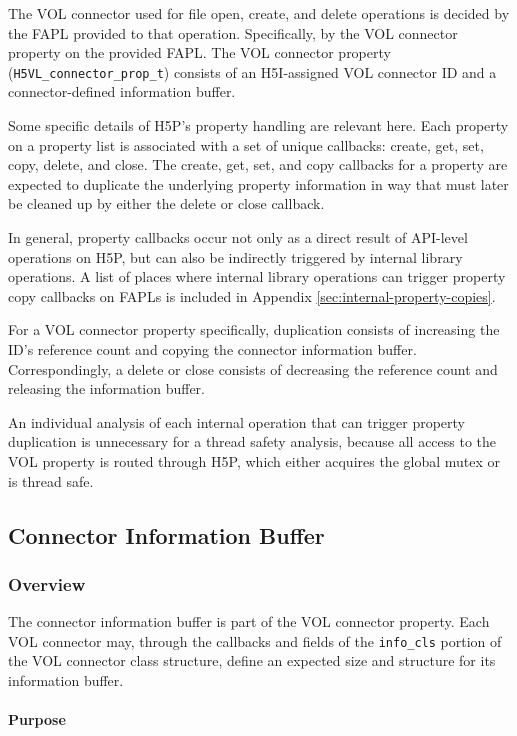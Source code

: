\documentclass{article}
\begin{document}
The VOL connector used for file open, create, and delete operations is decided by the FAPL provided to that operation. Specifically, by the VOL connector property on the provided FAPL. The VOL connector property (\texttt{H5VL\_connector\_prop\_t}) consists of an H5I-assigned VOL connector ID and a connector-defined information buffer.

Some specific details of H5P's property handling are relevant here. Each property on a property list is associated with a set of unique callbacks: create, get, set, copy, delete, and close. The create, get, set, and copy callbacks for a property are expected to duplicate the underlying property information in way that must later be cleaned up by either the delete or close callback.

In general, property callbacks occur not only as a direct result of API-level operations on H5P, but can also be indirectly triggered by internal library operations. A list of places where internal library operations can trigger property copy callbacks on FAPLs is included in Appendix \ref{sec:internal-property-copies}.

For a VOL connector property specifically, duplication consists of increasing the ID's reference count and copying the connector information buffer. Correspondingly, a delete or close consists of decreasing the reference count and releasing the information buffer.

An individual analysis of each internal operation that can trigger property duplication is unnecessary for a thread safety analysis, because all access to the VOL property is routed through H5P, which either acquires the global mutex or is thread safe. 

\subsection{Connector Information Buffer}
\label{sec:conn-info}
\subsubsection{Overview}

The connector information buffer is part of the VOL connector property. Each VOL connector may, through the callbacks and fields of the \texttt{info\_cls} portion of the VOL connector class structure, define an expected size and structure for its information buffer. 

\paragraph{Purpose}
\end{document}
